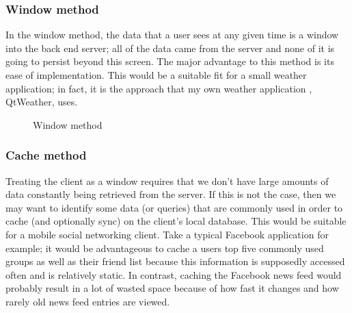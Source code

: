 \documentclass[journal]{IEEEtran}
\begin{document}
\subsubsection{Window method}

In the window method, the data that a user sees at any given time is a window into the back end server; all of the data came from the server and none of it is going to persist beyond this screen. The major advantage to this method is its ease of implementation. This would be a suitable fit for a small weather application; in fact, it is the approach that my own weather application , QtWeather, uses.  


\begin{figure}[h!]
\centering
{}
\caption{Window method}
\label{fig:window}
\end{figure}


\subsubsection{Cache method}

Treating the client as a window requires that we don't have large amounts of data constantly being retrieved from the server. If this is not the case, then we may want to identify some data (or queries) that are commonly used in order to cache (and optionally sync) on the client's local database. This would be suitable for a mobile social networking client. Take a typical Facebook application for example; it would be advantageous to cache a users top five commonly used groups as well as their friend list because this information is supposedly accessed often and is relatively static. In contrast, caching the Facebook news feed would probably result in a lot of wasted space because of how fast it changes and how rarely old news feed entries are viewed. 
\end{document}
